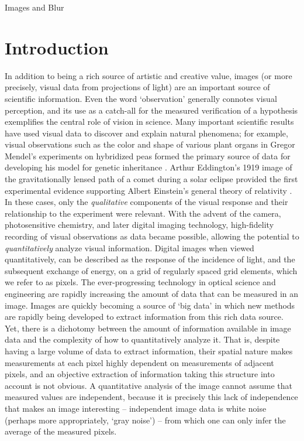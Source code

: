 \setlength{\parindent}{2ex}
\begin{chapter}{Images and Blur}\label{chapter:introduction}
  \section{Introduction}
  In addition to being a rich source of artistic and creative value, images (or more precisely, visual data from projections of light) are an important source of scientific information.
  Even the word `observation' generally connotes visual perception, and its use as a catch-all for the measured verification of a hypothesis exemplifies the central role of vision in science.
  Many important scientific results have used visual data to discover and explain natural phenomena; for example, visual observations such as the color and shape of various plant organs in Gregor Mendel's experiments on hybridized peas formed the primary source of data for developing his model for genetic inheritance \citep{magner2002}.
  Arthur Eddington's 1919 image of the gravitationally lensed path of a comet during a solar eclipse provided the first experimental evidence supporting Albert Einstein's general theory of relativity \citep{eddington1920}.
  In these cases, only the \emph{qualitative} components of the visual response and their relationship to the experiment were relevant.
  With the advent of the camera, photosensitive chemistry, and later digital imaging technology, high-fidelity recording of visual observations as data became possible, allowing the potential to \emph{quantitatively} analyze visual information.
  Digital images when viewed quantitatively, can be described as the response of the incidence of light, and the subsequent exchange of energy, on a grid of regularly spaced grid elements, which we refer to as pixels.
  The ever-progressing technology in optical science and engineering are rapidly increasing the amount of data that can be measured in an image.
  Images are quickly becoming a source of `big data' in which new methods are rapidly being developed to extract information from this rich data source.
  Yet, there is a dichotomy between the amount of information available in image data and the complexity of how to quantitatively analyze it.
That is, despite having a large volume of data to extract information, their spatial nature makes measurements at each pixel highly dependent on measurements of adjacent pixels, and an objective extraction of information taking this structure into account is not obvious.
  A quantitative analysis of the image cannot assume that measured values are independent, because it is precisely this lack of independence that makes an image interesting -- independent image data is white noise (perhaps more appropriately, `gray noise') -- from which one can only infer the average of the measured pixels.


\end{chapter}

